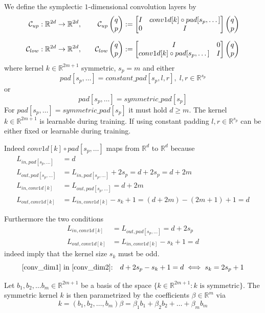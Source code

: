 \documentclass[twoside,a4paper]{article}
\begin{document}

We define the symplectic $1$-dimensional convolution layers by
\begin{alignat*}{2}
	\mathcal{C}_{up} &: \mathbb{R}^{2d} \to \mathbb{R}^{2d},
	\quad&\mathcal{C}_{up} \begin{pmatrix} q \\ p \end{pmatrix} := \begin{bmatrix} I & {conv1d[k] \circ pad[s_p,\dots]} \\ 0 & I \end{bmatrix} \begin{pmatrix} q \\ p \end{pmatrix} \\[7pt]
	\mathcal{C}_{low} &: \mathbb{R}^{2d} \to \mathbb{R}^{2d},
	&\mathcal{C}_{low} \begin{pmatrix} q \\ p \end{pmatrix} := \begin{bmatrix} I & 0 \\ {conv1d[k] \circ pad[s_p,\dots]} & I \end{bmatrix} \begin{pmatrix} q \\ p \end{pmatrix}
\end{alignat*}
where kernel $k \in \mathbb{R}^{2m+1}$ symmetric, $s_p = m$ and either
\begin{equation*}
	pad[s_p,\dots] = constant\_pad[s_p,l,r],\; l,r \in \mathbb{R}^{s_p}
\end{equation*}
or
\begin{equation*}
	pad[s_p,\dots] = symmetric\_pad[s_p]
\end{equation*}
For $pad[s_p,\dots] = symmetric\_pad[s_p]$ it must hold $d \geq m$.
The kernel $k \in \mathbb{R}^{2m+1}$ is learnable during training.
If using constant padding $l,r \in \mathbb{R}^{s_p}$ can be either fixed or learnable during training.

Indeed $conv1d[k] \circ pad[s_p,\dots]$ maps from $\mathbb{R}^d$ to $\mathbb{R}^d$ because
\begin{align*}
	L_{in,pad[s_p,\dots]} &= d \\
	L_{out,pad[s_p,\dots]} &= L_{in,pad[s_p,\dots]} + 2s_p = d+2s_p = d+2m \\
	L_{in,conv1d[k]} &= L_{out,pad[s_p,\dots]} = d+2m \\
	L_{out,conv1d[k]} &= L_{in,conv1d[k]} - s_k + 1 = (d+2m) - (2m+1) + 1 = d
\end{align*}

Furthermore the two conditions
\begin{align}
	L_{in,conv1d[k]} &= L_{out,pad[s_p,\dots]} = d+2s_p \label{conv_dim1} \\ 
	L_{out,conv1d[k]} &= L_{in,conv1d[k]} - s_k + 1 = d \label{conv_dim2}
\end{align}
indeed imply that the kernel size $s_k$ must be odd.
\begin{equation*}
	\text{\cref{conv_dim1} in \cref{conv_dim2}:} \quad d+2s_p - s_k + 1 = d \iff s_k = 2s_p+1
\end{equation*}

Let ${b_1, b_2, \dots b_m} \in \mathbb{R}^{2m+1}$ be a basis of the space 
$\{ k \in \mathbb{R}^{2m+1} : k \text{ is symmetric} \}$.
The symmetric kernel $k$ is then parametrized by the coefficients $\beta \in \mathbb{R}^m$ via
\begin{equation*}
	k = (b_1, b_2, \dots, b_m) \beta = \beta_1 b_1 + \beta_2 b_2 + \dots + \beta_m b_m
\end{equation*}
\end{document}
